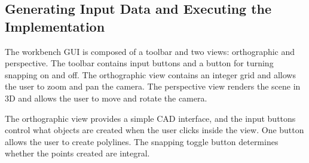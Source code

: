 




% 

% 
  


\subsection{Generating Input Data and Executing the Implementation} 

The workbench GUI is composed of a toolbar and two views: orthographic and
perspective. The toolbar contains input buttons and a button for turning
snapping on and off. The orthographic view contains an integer grid and allows
the user to zoom and pan the camera. The perspective view renders the scene in
3D and allows the user to move and rotate the camera.

The orthographic view provides a simple CAD interface, and the input buttons
control what objects are created when the user clicks inside the view. One
button allows the user to create polylines. The snapping toggle button
determines whether the points created are integral. 

